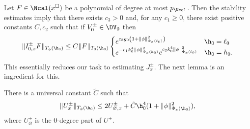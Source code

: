 Let $F \in \Ncal(x^\square)$ be a polynomial of degree at most $p_\Ncal$.
Then the stability estimates \cite[\eqref{IE-e:Iupper-a}--\eqref{IE-e:Iupper-b}]{BS-rg-IE}
imply that there exists $c_3 > 0$ and, for any $c_1 \geq 0$,
there exist positive constants $C, c_2$ such that
if $V_0^\pm \in \DV_0$ then
\begin{equation}
\label{e:Iupper}
\|I^\pm_{0,x} F\|_{T_\phi(\h_0)}
  \leq
C \|F\|_{T_0(\h_0)}
\begin{cases}
  e^{c_3 g_0 \left(1 + \|\phi\|^2_{\Phi_x(\ell_0)}\right)}
    & \h_0 = \ell_0 \\
  e^{-c_1 k_0^4 \|\phi\|^2_{\Phi_x(h_0)}} e^{c_2 k_0^4 \|\phi\|^2_{\tilde\Phi_x(\ell_0)}}
    & \h_0 = h_0.
\end{cases}
\end{equation}
This essentially reduces our task to estimating $J^\pm_x$.
The next lemma is an ingredient for this.

\begin{lemma}
\label{lem:FFnull-loc}
There is a universal constant $\tilde C$ such that
\begin{equation}
\label{e:FFnull}
\|U^\pm_x\|_{T_\phi(\h_0)}
  \leq
2 U^\pm_{\varnothing,x} + \tilde C \h_0^4 (1 + \|\phi\|^2_{\Phi_x(\h_0)}),
\end{equation}
where $U^\pm_\varnothing$ is the 0-degree part of $U^\pm$.
\end{lemma}

